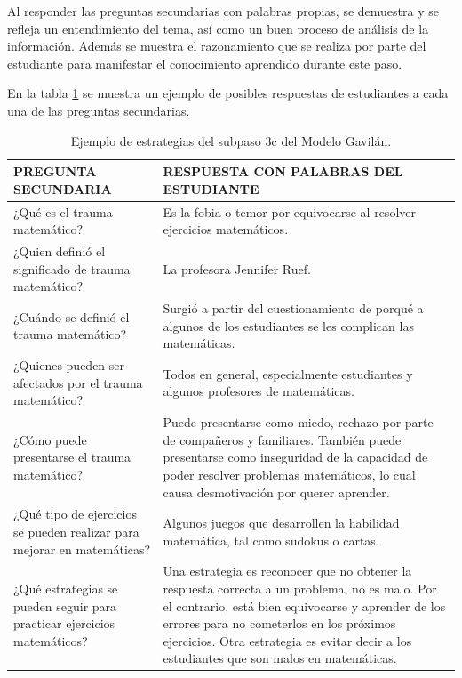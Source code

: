 Al responder las preguntas secundarias con palabras propias, se demuestra y se refleja un entendimiento del tema, así como un buen proceso de análisis de la información. Además se muestra el razonamiento que se realiza por parte del estudiante para manifestar el conocimiento aprendido durante este paso.

En la tabla \ref{tab:t7} se muestra un ejemplo de posibles respuestas de estudiantes a cada una de las preguntas secundarias.

\begin{table}
  \begin{center}
    \begin{tabular}{ | p{8cm} | p{8cm} | }
      \hline
      PREGUNTA SECUNDARIA & RESPUESTA CON PALABRAS DEL ESTUDIANTE \\ \hline
      ¿Qué es el trauma matemático? & Es la fobia o temor por equivocarse al resolver ejercicios matemáticos. \\ \hline
      ¿Quien definió el significado de trauma matemático? & La profesora Jennifer Ruef. \\ \hline
      ¿Cuándo se definió el trauma matemático? & Surgió a partir del cuestionamiento de porqué a algunos de los estudiantes se les complican las matemáticas. \\ \hline
      ¿Quienes pueden ser afectados por el trauma matemático? & Todos en general, especialmente estudiantes y algunos profesores de matemáticas. \\ \hline
      ¿Cómo puede presentarse el trauma matemático? & Puede presentarse como miedo, rechazo por parte de compañeros y familiares. También puede presentarse como inseguridad de la capacidad de poder resolver problemas matemáticos, lo cual causa desmotivación por querer aprender. \\ \hline
      ¿Qué tipo de ejercicios se pueden realizar para mejorar en matemáticas? & Algunos juegos que desarrollen la habilidad matemática, tal como sudokus o cartas. \\ \hline
      ¿Qué estrategias se pueden seguir para practicar ejercicios matemáticos? & Una estrategia es reconocer  que no obtener la respuesta correcta a un problema, no es malo. Por el contrario, está bien equivocarse y aprender de los errores para no cometerlos en los próximos ejercicios. Otra estrategia es evitar decir a los estudiantes que son malos en matemáticas.
       \\ \hline
    \end{tabular}
    \caption{Ejemplo de estrategias del subpaso 3c del Modelo Gavilán.}
    \label{tab:t7}
  \end{center}
\end{table}

